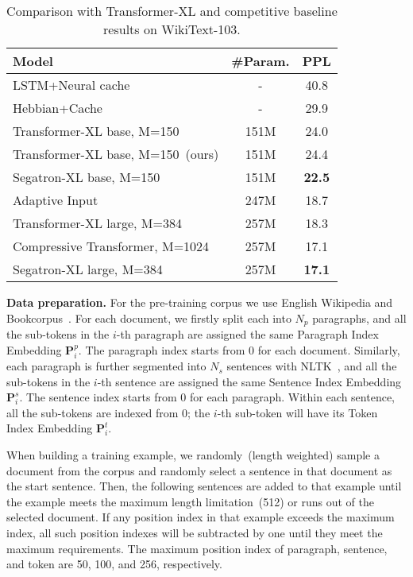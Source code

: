 \documentclass[letterpaper]{article}
\begin{document}
\begin{table*}[t]\centering
  \small
  \begin{tabular}{lcc}\toprule
  Model &\#Param. &PPL \\\midrule
  LSTM+Neural cache~\cite{DBLP:conf/iclr/GraveJU17} &- &40.8 \\
  Hebbian+Cache~\cite{DBLP:conf/icml/RaeDDL18} &- &29.9 \\
  Transformer-XL base, M=150~\cite{DBLP:conf/acl/DaiYYCLS19} &151M &24.0 \\
  Transformer-XL base, M=150~(ours) &151M &24.4 \\
  Segatron-XL base, M=150 &151M &\textbf{22.5} \\
  \hline
  Adaptive Input~\cite{DBLP:conf/iclr/BaevskiA19} & 247M &18.7 \\
  Transformer-XL large, M=384~\cite{DBLP:conf/acl/DaiYYCLS19} &257M &18.3 \\
  Compressive Transformer, M=1024~\cite{DBLP:conf/iclr/RaePJHL20} &257M&17.1 \\
  Segatron-XL large, M=384 &257M &\textbf{17.1} \\
  \bottomrule
  \end{tabular}
  \caption{Comparison with Transformer-XL and competitive baseline results on WikiText-103.}\label{tab: wiki103}
\end{table*} \smallskip\noindent\textbf{Data preparation.}
For the pre-training corpus we use English Wikipedia and Bookcorpus~\cite{DBLP:conf/iccv/bookcorpus}.
For each document, we firstly split each into $N_p$ paragraphs, and all the sub-tokens in the $i$-th paragraph are assigned the same Paragraph Index Embedding $\mathbf{P}^p_{i}$.
The paragraph index starts from 0 for each document.
Similarly, each paragraph is further segmented into $N_s$ sentences with NLTK~\cite{DBLP:books/daglib/nltk}, and all the sub-tokens in the $i$-th sentence are assigned the same Sentence Index Embedding $\mathbf{P}^s_{i}$.
The sentence index starts from 0 for each paragraph.
Within each sentence, all the sub-tokens are indexed from 0; 
the $i$-th sub-token will have its Token Index Embedding $\mathbf{P}^t_i$.

When building a training example, we randomly~(length weighted) sample a document from the corpus and randomly select a sentence in that document as the start sentence. 
Then, the following sentences are added to that example until the example meets the maximum length limitation~(512) or runs out of the selected document.
If any position index in that example exceeds the maximum index, all such position indexes will be subtracted by one until they meet the maximum requirements.
The maximum position index of paragraph, sentence, and token are 50, 100, and 256, respectively.
\end{document}

